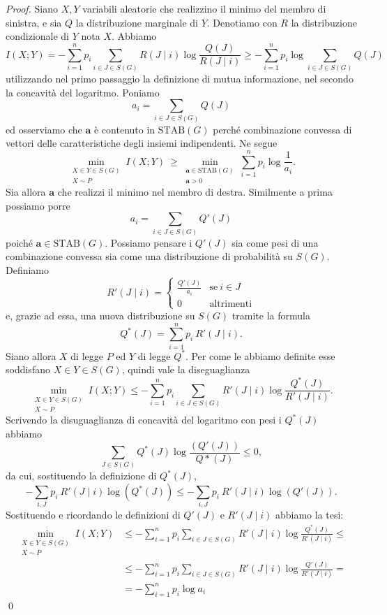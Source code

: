 \begin{proof}
	Siano \(X,Y\) variabili aleatorie che realizzino il minimo del membro di sinistra, e sia \(Q\) la distribuzione marginale di \(Y\). Denotiamo con \(R\) la distribuzione condizionale di \(Y\) nota \(X\). Abbiamo
	\[I(X;Y)=-\sum_{i=1}^n p_i\sum_{i\in J\in S(G)} R(J\mid i)\log{\frac{Q(J)}{R(J\mid i)}}\ge -\sum_{i=1}^n p_i \log{\sum_{i\in J\in S(G)}} Q(J)\]
	utilizzando nel primo passaggio la definizione di mutua informazione, nel secondo la concavità del logaritmo. Poniamo
	\[a_i=\sum_{i\in J\in S(G)} Q(J)\]
	ed osserviamo che \(\mathbf{a}\) è contenuto in \(\text{STAB}(G)\) perché combinazione convessa di vettori delle caratteristiche degli insiemi indipendenti. Ne segue
	\[\min_{\substack{X\in Y\in S(G) \\
	X\sim P}} I(X;Y)\ \ge \min_{\substack{\mathbf{a}\in \text{STAB}(G) \\
	\mathbf{a}>0}} \sum_{i=1}^n p_i\log{\frac{1}{a_i}}.\]
	Sia allora \(\mathbf{a}\) che realizzi il minimo nel membro di destra. Similmente a prima possiamo porre
	\[a_i=\sum_{i\in J\in S(G)} Q'(J)\]
	poiché \(\mathbf{a}\in \text{STAB}(G)\). Possiamo pensare i \(Q'(J)\) sia come pesi di una combinazione convessa sia come una distribuzione di probabilità su \(S(G)\). Definiamo
	\[R'(J\mid i)= 
	\begin{cases}
		\frac{Q'(J)}{a_i} & \text{se}\ i\in J\\
		0 & \text{altrimenti} 
	\end{cases}
	\]
	e, grazie ad essa, una nuova distribuzione su \(S(G)\) tramite la formula
	\[Q^*(J)=\sum_{i=1}^n p_i\ R'(J\mid i).\]
	Siano allora \(X\) di legge \(P\) ed \(Y\) di legge \(Q^*\). Per come le abbiamo definite esse soddisfano \(X\in Y\in S(G)\), quindi vale la diseguaglianza
	\[\min_{\substack{X\in Y\in S(G) \\
	X\sim P}} I(X;Y)\le -\sum_{i=1}^n p_i\sum_{i\in J\in S(G)} R'(J\mid i)\log{\frac{Q^*(J)}{R'(J\mid i)}}.\]
	Scrivendo la disuguaglianza di concavità del logaritmo con pesi i \(Q^*(J)\) abbiamo
	\[\sum_{J\in S(G)} Q^*(J)\log{\frac{(Q'(J))}{Q*(J)}} \le 0,\]
	da cui, sostituendo la definizione di \(Q^*(J)\),
	\[-\sum_{i,J} p_i\ R'(J\mid i)\log(Q^*(J))\le -\sum_{i,J} p_i\ R'(J\mid i)\log(Q'(J)).\]
	Sostituendo e ricordando le definizioni di \(Q'(J)\) e \(R'(J\mid i)\) abbiamo la tesi: 
	\begin{align}
		\min_{\substack{X\in Y\in S(G) \\
		X\sim P}} I(X;Y)&\le -\sum_{i=1}^n p_i\sum_{i\in J\in S(G)} R'(J\mid i)\log{\frac{Q^*(J)}{R'(J\mid i)}}\le \nonumber \\
		&\le -\sum_{i=1}^n p_i\sum_{i\in J\in S(G)} R'(J\mid i)\log{\frac{Q'(J)}{R'(J\mid i)}}= \nonumber \\
		&= -\sum_{i=1}^n p_i\log{a_i} \nonumber 
	\end{align}
	\qed 
\end{proof}